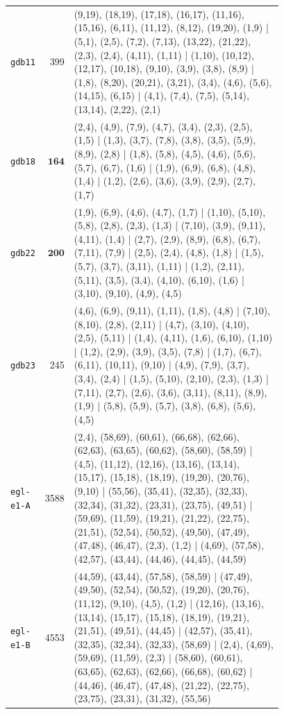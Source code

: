\begin{landscape}
\begin{longtable}{lr>{\tiny\raggedright\arraybackslash}p{0.78\linewidth}}
\texttt{gdb11} & 399 & (9,19), (18,19), (17,18), (16,17), (11,16), (15,16), (6,11), (11,12), (8,12), (19,20), (1,9) | (5,1), (2,5), (7,2), (7,13), (13,22), (21,22), (2,3), (2,4), (4,11), (1,11) | (1,10), (10,12), (12,17), (10,18), (9,10), (3,9), (3,8), (8,9) | (1,8), (8,20), (20,21), (3,21), (3,4), (4,6), (5,6), (14,15), (6,15) | (4,1), (7,4), (7,5), (5,14), (13,14), (2,22), (2,1) \\[2pt]
\texttt{gdb18} & $\mathbf{164}$ & (2,4), (4,9), (7,9), (4,7), (3,4), (2,3), (2,5), (1,5) | (1,3), (3,7), (7,8), (3,8), (3,5), (5,9), (8,9), (2,8) | (1,8), (5,8), (4,5), (4,6), (5,6), (5,7), (6,7), (1,6) | (1,9), (6,9), (6,8), (4,8), (1,4) | (1,2), (2,6), (3,6), (3,9), (2,9), (2,7), (1,7) \\[2pt]
\texttt{gdb22} & $\mathbf{200}$ & (1,9), (6,9), (4,6), (4,7), (1,7) | (1,10), (5,10), (5,8), (2,8), (2,3), (1,3) | (7,10), (3,9), (9,11), (4,11), (1,4) | (2,7), (2,9), (8,9), (6,8), (6,7), (7,11), (7,9) | (2,5), (2,4), (4,8), (1,8) | (1,5), (5,7), (3,7), (3,11), (1,11) | (1,2), (2,11), (5,11), (3,5), (3,4), (4,10), (6,10), (1,6) | (3,10), (9,10), (4,9), (4,5) \\[2pt]
\texttt{gdb23} & 245 & (4,6), (6,9), (9,11), (1,11), (1,8), (4,8) | (7,10), (8,10), (2,8), (2,11) | (4,7), (3,10), (4,10), (2,5), (5,11) | (1,4), (4,11), (1,6), (6,10), (1,10) | (1,2), (2,9), (3,9), (3,5), (7,8) | (1,7), (6,7), (6,11), (10,11), (9,10) | (4,9), (7,9), (3,7), (3,4), (2,4) | (1,5), (5,10), (2,10), (2,3), (1,3) | (7,11), (2,7), (2,6), (3,6), (3,11), (8,11), (8,9), (1,9) | (5,8), (5,9), (5,7), (3,8), (6,8), (5,6), (4,5) \\[2pt]
\texttt{egl-e1-A} & 3588 & (2,4), (58,69), (60,61), (66,68), (62,66), (62,63), (63,65), (60,62), (58,60), (58,59) | (4,5), (11,12), (12,16), (13,16), (13,14), (15,17), (15,18), (18,19), (19,20), (20,76), (9,10) | (55,56), (35,41), (32,35), (32,33), (32,34), (31,32), (23,31), (23,75), (49,51) | (59,69), (11,59), (19,21), (21,22), (22,75), (21,51), (52,54), (50,52), (49,50), (47,49), (47,48), (46,47), (2,3), (1,2) | (4,69), (57,58), (42,57), (43,44), (44,46), (44,45), (44,59) \\[2pt]
\texttt{egl-e1-B} & 4553 & (44,59), (43,44), (57,58), (58,59) | (47,49), (49,50), (52,54), (50,52), (19,20), (20,76), (11,12), (9,10), (4,5), (1,2) | (12,16), (13,16), (13,14), (15,17), (15,18), (18,19), (19,21), (21,51), (49,51), (44,45) | (42,57), (35,41), (32,35), (32,34), (32,33), (58,69) | (2,4), (4,69), (59,69), (11,59), (2,3) | (58,60), (60,61), (63,65), (62,63), (62,66), (66,68), (60,62) | (44,46), (46,47), (47,48), (21,22), (22,75), (23,75), (23,31), (31,32), (55,56) \\[2pt]

\end{longtable}
\end{landscape}
